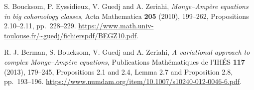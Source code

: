 S. Boucksom, P. Eyssidieux, V. Guedj and A. Zeriahi,
\emph{Monge--Ampère equations in big cohomology classes},
Acta Mathematica \textbf{205} (2010), 199--262,
Propositions 2.10--2.11, pp.~228--229.
\url{https://www.math.univ-toulouse.fr/~guedj/fichierspdf/BEGZ10.pdf}.

R. J. Berman, S. Boucksom, V. Guedj and A. Zeriahi,
\emph{A variational approach to complex Monge--Ampère equations},
Publications Mathématiques de l'IHÉS \textbf{117} (2013), 179--245,
Propositions 2.1 and 2.4, Lemma 2.7 and Proposition 2.8,
pp.~193--196.
\url{https://www.numdam.org/item/10.1007/s10240-012-0046-6.pdf}.
